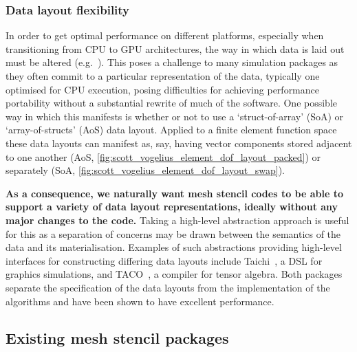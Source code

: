 \documentclass[thesis]{subfiles}
\begin{document}
\subsubsection{Data layout flexibility}
\label{sec:intro_data_layout_flex}

In order to get optimal performance on different platforms, especially when transitioning from CPU to GPU architectures, the way in which data is laid out must be altered (e.g.~\cite{markallFiniteElementAssembly2013,sulyokImprovingLocalityUnstructured2018}).
This poses a challenge to many simulation packages as they often commit to a particular representation of the data, typically one optimised for CPU execution, posing difficulties for achieving performance portability without a substantial rewrite of much of the software.
One possible way in which this manifests is whether or not to use a `struct-of-array' (SoA) or `array-of-structs' (AoS) data layout.
Applied to a finite element function space these data layouts can manifest as, say, having vector components stored adjacent to one another (AoS, \cref{fig:scott_vogelius_element_dof_layout_packed}) or separately (SoA, \cref{fig:scott_vogelius_element_dof_layout_swap}).

\textbf{As a consequence, we naturally want mesh stencil codes to be able to support a variety of data layout representations, ideally without any major changes to the code.}
Taking a high-level abstraction approach is useful for this as a separation of concerns may be drawn between the semantics of the data and its materialisation.
Examples of such abstractions providing high-level interfaces for constructing differing data layouts include Taichi~\cite{huTaichiLanguageHighperformance2019}, a DSL for graphics simulations, and TACO~\cite{kjolstadTacoToolGenerate2017}, a compiler for tensor algebra.
Both packages separate the specification of the data layouts from the implementation of the algorithms and have been shown to have excellent performance.

\subsection{Existing mesh stencil packages}
\label{sec:intro_existing_software}
\end{document}
